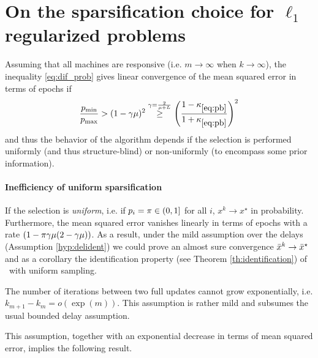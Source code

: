 \section{On the sparsification choice for $\ell_1$ regularized problems}\label{sec:distributed-adaptive}

Assuming that all machines are responsive (i.e. $m\to \infty$ when $k\to\infty$), the inequality \eqref{eq:dif_prob} gives linear convergence of the mean squared error in terms of epochs if
\begin{equation}\label{eq:prob_gap}
    \frac{p_{\min}}{p_{\max}} > (1-\gamma \mu)^2 \stackrel{\gamma = \frac{2}{\mu + L}}{\geq} \left(\frac{1-\kappa_{\eqref{eq:pb}}}{1+\kappa_{\eqref{eq:pb}}}\right)^2
\end{equation}
and thus the behavior of the algorithm depends if the selection is performed uniformly (and thus structure-blind) or non-uniformly (to encompass some prior information).

\paragraph{Inefficiency of uniform sparsification}

If the selection is \emph{uniform}, i.e. if $p_i=\pi\in(0,1]$ for all $i$, $x^k\to x^\star$ in probability. Furthermore, the mean squared error vanishes linearly in terms of epochs with a rate $(1-\pi\gamma\mu(2-\gamma\mu))$. As a result, under the mild assumption over the delays (Assumption \ref{hyp:delident}) we could prove an almost sure convergence $\bar{x}^k\to \bar{x}^\star$ and as a corollary the identification property (see Theorem \ref{th:identification}) of \spy~with uniform sampling.

\begin{assumption}
\label{hyp:delident}
The number of iterations between two full updates cannot grow exponentially, i.e. $k_{m+1}-k_m = o(\exp(m))$.
This assumption is rather mild and subsumes the usual bounded delay assumption.
\end{assumption}

This assumption, together with an exponential decrease in terms of mean squared error, implies the following result.

